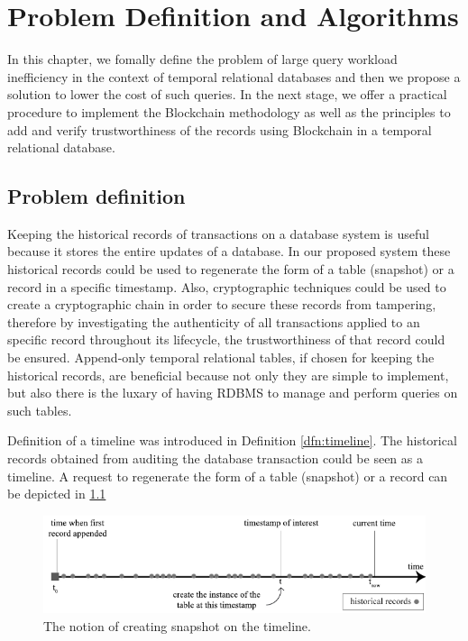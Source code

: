 \chapter{Problem Definition and Algorithms}
	In this chapter, we fomally define the problem of large query workload inefficiency in the context of temporal relational databases and then we propose a solution to lower the cost of such queries. In the next stage, we offer a practical procedure to implement the Blockchain methodology as well as the principles to add and verify trustworthiness of the records using Blockchain in a temporal relational database.

	\section{Problem definition}
		Keeping the historical records of transactions on a database system is useful because it stores the entire updates of a database. In our proposed system these historical records could be used to regenerate the form of a table (snapshot) or a record in a specific timestamp. Also, cryptographic techniques could be used to create a cryptographic chain in order to secure these records from tampering, therefore by investigating the authenticity of all transactions applied to an specific record throughout its lifecycle, the trustworthiness of that record could be ensured. Append-only temporal relational tables, if chosen for keeping the historical records, are beneficial because not only they are simple to implement, but also there is the luxary of having RDBMS to manage and perform queries on such tables.

		\begin{example}
			Definition of a timeline was introduced in Definition \ref{dfn:timeline}. The historical records obtained from auditing the database transaction could be seen as a timeline. A request to regenerate the form of a table (snapshot) or a record can be depicted in \ref{fig:snapshot_notion}
		\label{example:timeline}
		\end{example}

		\begin{figure}
			\centering
			\includegraphics[width=\textwidth]{figs/snapshot_notion.pdf}
			\caption{The notion of creating snapshot on the timeline.}
			\label{fig:snapshot_notion}
		\end{figure}


